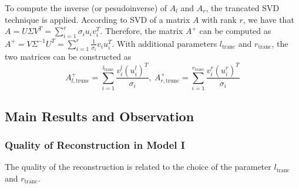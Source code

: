 To compute the inverse (or pesudoinverse) of $A_l$ and $A_r$, the trancated SVD technique is applied. According to SVD of a matrix $A$ with rank $r$, we have that $A = U \Sigma V^T = \sum_{i = 1}^{r}\sigma_iu_iv_i^T$. Therefore, the matrix $A^+$ can be computed as $A^+ = V \Sigma^{-1} U^T = \sum_{i = 1}^r \frac{1}{\sigma_i}v_iu_i^T$. With additional parameters $l_{\text{tranc}}$ and $r_{\text{tranc}}$, the two matrices can be constructed as 
\begin{equation} \tag{3.4}
    A_{l, \text{trunc}}^+ = \sum_{i = 1}^{l_{\text{tranc}}}\frac{v_i^l(u_i^l)^T}{\sigma_i}, \ A_{r, \text{trunc}}^+ = \sum_{i = 1}^{r_{\text{tranc}}}\frac{v_i^r(u_i^r)^T}{\sigma_i}
\end{equation}
\subsection{Main Results and Observation}
\subsubsection{Quality of Reconstruction in Model I}
The quality of the reconstruction is related to the choice of the parameter $l_{\text{tranc}}$ and $r_{\text{tranc}}$. 

